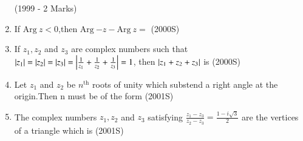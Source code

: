 \documentclass[journal,12pt,twocolumn]{IEEEtran}
\theoremstyle{remark}
\begin{document}
\begin{enumerate}[start=6]
\hfill{(1999 - 2 Marks)}
\begin{enumerate}
\end{enumerate}
\item If $\mathrm{Arg}\ z<0$,then $\mathrm{Arg}\ {-z}-\mathrm{Arg}\ z= $
\hfill{(2000S)}
\begin{enumerate}
\end{enumerate}
\item If $z_1,z_2$ and $z_3$ are complex numbers such that $\left\vert z_1\right\vert=\left\vert z_2\right\vert=\left\vert z_3\right\vert=\left\vert\frac{1}{z_1}+\frac{1}{z_2}+\frac{1}{z_3}\right\vert=1$, then $\left\vert z_1+z_2+z_3\right\vert$ is 
\hfill{(2000S)}
\begin{enumerate}
\end{enumerate}
\item Let $z_1$ and $z_2$ be $n^{\text{th}}$ roots of unity which substend a right angle at the origin.Then n must be of the form
\hfill{(2001S)}
\begin{enumerate}
\end{enumerate}
\item The complex numbers $z_1,z_2$ and $z_3$ satisfying $\frac{z_1-z_3}{z_2-z_3}=\frac{1-i\sqrt{3}}{2}$ are the vertices of a triangle which is
\hfill{(2001S)}

\end{enumerate}
\end{document}
